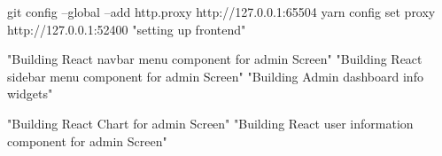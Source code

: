 git config --global --add http.proxy http://127.0.0.1:65504
yarn config set proxy http://127.0.0.1:52400
"setting up frontend"

"Building React navbar menu component for admin Screen"
"Building React sidebar menu component for admin Screen"
"Building Admin dashboard info widgets"

"Building React Chart for admin Screen"
"Building React user information component for admin Screen"
